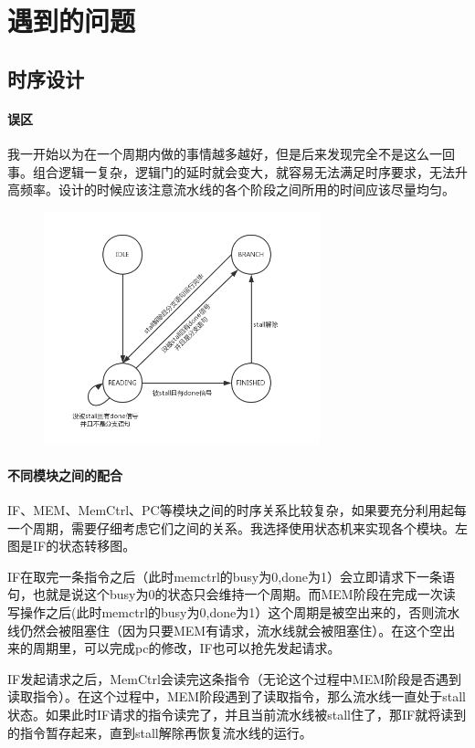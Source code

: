 \documentclass[UTF8]{ctexart}
\begin{document}
\section{遇到的问题}

	\subsection{时序设计}
		\paragraph{误区} 我一开始以为在一个周期内做的事情越多越好，但是后来发现完全不是这么一回事。组合逻辑一复杂，逻辑门的延时就会变大，就容易无法满足时序要求，无法升高频率。设计的时候应该注意流水线的各个阶段之间所用的时间应该尽量均匀。
		
		\begin{figure}
		\includegraphics[width=8cm]{IF_stage.png}		
		\end{figure}
		
		\paragraph{不同模块之间的配合} IF、MEM、MemCtrl、PC等模块之间的时序关系比较复杂，如果要充分利用起每一个周期，需要仔细考虑它们之间的关系。我选择使用状态机来实现各个模块。左图是IF的状态转移图。
		
		IF在取完一条指令之后（此时memctrl的busy为0,done为1）会立即请求下一条语句，也就是说这个busy为0的状态只会维持一个周期。而MEM阶段在完成一次读写操作之后(此时memctrl的busy为0,done为1）这个周期是被空出来的，否则流水线仍然会被阻塞住（因为只要MEM有请求，流水线就会被阻塞住）。在这个空出来的周期里，可以完成pc的修改，IF也可以抢先发起请求。
		
		IF发起请求之后，MemCtrl会读完这条指令（无论这个过程中MEM阶段是否遇到读取指令）。在这个过程中，MEM阶段遇到了读取指令，那么流水线一直处于stall状态。如果此时IF请求的指令读完了，并且当前流水线被stall住了，那IF就将读到的指令暂存起来，直到stall解除再恢复流水线的运行。
		
\end{document}
